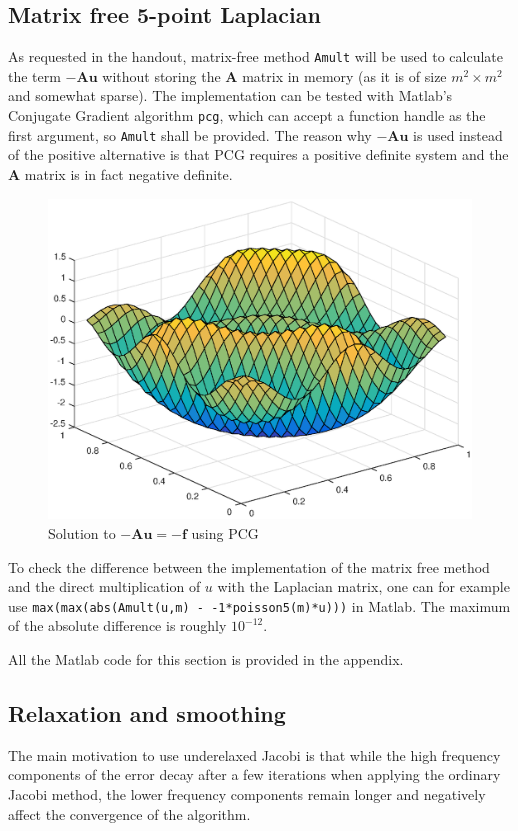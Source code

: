 \documentclass[main.tex]{subfiles}
\begin{document}
\subsection{Matrix free 5-point Laplacian}
As requested in the handout, matrix-free method \texttt{Amult} will be used to calculate the term $\mathbf{-A u}$ without storing the $\mathbf{A}$ matrix in memory (as it is of size $m^2 \times m^2$ and somewhat sparse). The implementation can be tested with Matlab's Conjugate Gradient algorithm \texttt{pcg}, which can accept a function handle as the first argument, so \texttt{Amult} shall be provided. The reason why $-\mathbf{A u}$ is used instead of the positive alternative is that PCG requires a positive definite system and the $\mathbf{A}$ matrix is in fact negative definite.
\begin{figure}[h]
    \centering
    \includegraphics[width=\textwidth]{../Figures/ex31}
    \caption{Solution to $-\mathbf{A u} = -\mathbf{f}$ using PCG}
\end{figure}
To check the difference between the implementation of the matrix free method and the direct multiplication of $u$ with the Laplacian matrix, one can for example use \texttt{max(max(abs(Amult(u,m) - -1*poisson5(m)*u)))} in Matlab. The maximum of the absolute difference is roughly $10^{-12}$.

All the Matlab code for this section is provided in the appendix. 

\subsection{Relaxation and smoothing}
The main motivation to use underelaxed Jacobi is that while the high frequency components of the error decay after a few iterations when applying the ordinary Jacobi method, the lower frequency components remain longer and negatively affect the convergence of the algorithm.
\end{document}
